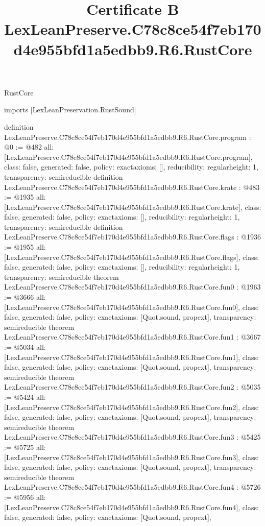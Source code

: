 \begin{lexlean}{RustCore}
\title{Certificate B LexLeanPreserve.C78c8ce54f7eb170d4e955bfd1a5edbb9.R6.RustCore}
\begin{coremodule}
imports [LexLeanPreservation.RustSound]

definition LexLeanPreserve.C78c8ce54f7eb170d4e955bfd1a5edbb9.R6.RustCore.program : @0 := @482 {
  all: [LexLeanPreserve.C78c8ce54f7eb170d4e955bfd1a5edbb9.R6.RustCore.program],
  class: false,
  generated: false,
  policy: exact{axioms: []},
  reducibility: regular{height: 1},
  transparency: semireducible
}
definition LexLeanPreserve.C78c8ce54f7eb170d4e955bfd1a5edbb9.R6.RustCore.krate : @483 := @1935 {
  all: [LexLeanPreserve.C78c8ce54f7eb170d4e955bfd1a5edbb9.R6.RustCore.krate],
  class: false,
  generated: false,
  policy: exact{axioms: []},
  reducibility: regular{height: 1},
  transparency: semireducible
}
definition LexLeanPreserve.C78c8ce54f7eb170d4e955bfd1a5edbb9.R6.RustCore.flags : @1936 := @1955 {
  all: [LexLeanPreserve.C78c8ce54f7eb170d4e955bfd1a5edbb9.R6.RustCore.flags],
  class: false,
  generated: false,
  policy: exact{axioms: []},
  reducibility: regular{height: 1},
  transparency: semireducible
}
theorem LexLeanPreserve.C78c8ce54f7eb170d4e955bfd1a5edbb9.R6.RustCore.fun0 : @1963 := @3666 {
  all: [LexLeanPreserve.C78c8ce54f7eb170d4e955bfd1a5edbb9.R6.RustCore.fun0],
  class: false,
  generated: false,
  policy: exact{axioms: [Quot.sound, propext]},
  transparency: semireducible
}
theorem LexLeanPreserve.C78c8ce54f7eb170d4e955bfd1a5edbb9.R6.RustCore.fun1 : @3667 := @5034 {
  all: [LexLeanPreserve.C78c8ce54f7eb170d4e955bfd1a5edbb9.R6.RustCore.fun1],
  class: false,
  generated: false,
  policy: exact{axioms: [Quot.sound, propext]},
  transparency: semireducible
}
theorem LexLeanPreserve.C78c8ce54f7eb170d4e955bfd1a5edbb9.R6.RustCore.fun2 : @5035 := @5424 {
  all: [LexLeanPreserve.C78c8ce54f7eb170d4e955bfd1a5edbb9.R6.RustCore.fun2],
  class: false,
  generated: false,
  policy: exact{axioms: [Quot.sound, propext]},
  transparency: semireducible
}
theorem LexLeanPreserve.C78c8ce54f7eb170d4e955bfd1a5edbb9.R6.RustCore.fun3 : @5425 := @5725 {
  all: [LexLeanPreserve.C78c8ce54f7eb170d4e955bfd1a5edbb9.R6.RustCore.fun3],
  class: false,
  generated: false,
  policy: exact{axioms: [Quot.sound, propext]},
  transparency: semireducible
}
theorem LexLeanPreserve.C78c8ce54f7eb170d4e955bfd1a5edbb9.R6.RustCore.fun4 : @5726 := @5956 {
  all: [LexLeanPreserve.C78c8ce54f7eb170d4e955bfd1a5edbb9.R6.RustCore.fun4],
  class: false,
  generated: false,
  policy: exact{axioms: [Quot.sound, propext]},
}
\end{coremodule}
\end{lexlean}
